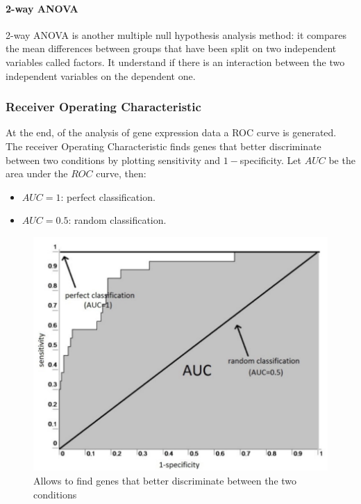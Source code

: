 			\paragraph{2-way ANOVA}
			2-way ANOVA is another multiple null hypothesis analysis method: it compares the mean differences between groups that have been split on two independent variables called factors.
			It understand if there is an interaction between the two independent variables on the dependent one.


		\subsubsection{Receiver Operating Characteristic}
		At the end, of the analysis of gene expression data a ROC curve is generated.
		The receiver Operating Characteristic finds genes that better discriminate between two conditions by plotting sensitivity and $1-$specificity.
		Let $AUC$ be the area under the $ROC$ curve, then:

		\begin{multicols}{2}
			\begin{itemize}
				\item $AUC=1$: perfect classification.
				\item $AUC = 0.5$: random classification.
			\end{itemize}
		\end{multicols}

		\begin{figure}
	\centering
	\includegraphics[scale=0.2]{ROC}
	\caption{Allows to find genes that better discriminate between the two conditions}
	\label{fig:design}
\end{figure}

